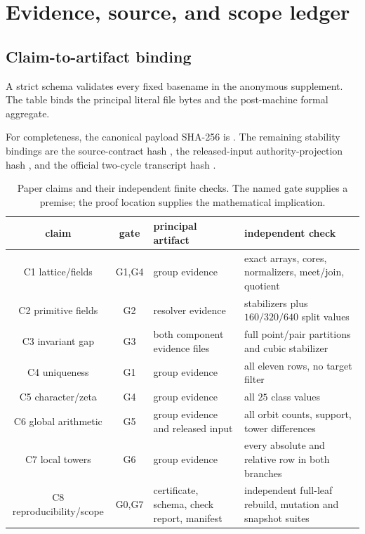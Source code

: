 \section{Evidence, source, and scope ledger}
\label{app:evidence}

\subsection{Claim-to-artifact binding}

A strict schema validates every fixed basename in the anonymous supplement.
The table binds the
principal literal file bytes and the post-machine formal aggregate.



For completeness, the canonical payload SHA-256 is
.
The remaining stability bindings are the source-contract hash
,
the released-input authority-projection hash
,
and the official two-cycle transcript hash
.

\begin{table}[htbp]
\centering
\caption{Paper claims and their independent finite checks.  The named gate
supplies a premise; the proof location supplies the mathematical implication.}
\label{tab:claim-artifact}
\small
\begin{tabularx}{\textwidth}{@{}cclY@{}}
\toprule
claim & gate & principal artifact & independent check\\
\midrule
C1 lattice/fields & G1,G4 & group evidence & exact arrays, cores,
normalizers, meet/join, quotient\\
C2 primitive fields & G2 & resolver evidence & stabilizers plus
$160/320/640$ split values\\
C3 invariant gap & G3 & both component evidence files & full point/pair
partitions and cubic stabilizer\\
C4 uniqueness & G1 & group evidence & all eleven rows, no target filter\\
C5 character/zeta & G4 & group evidence & all $25$ class values\\
C6 global arithmetic & G5 & group evidence and released input & all orbit
counts, support, tower differences\\
C7 local towers & G6 & group evidence & every absolute and relative row in
both branches\\
C8 reproducibility/scope & G0,G7 & certificate, schema, check report,
manifest & independent full-leaf rebuild, mutation and snapshot suites\\
\bottomrule
\end{tabularx}
\end{table}

